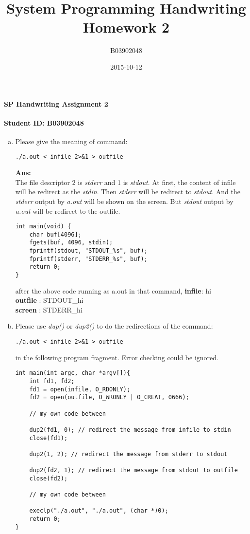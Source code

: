 \documentclass{article}
\title{System Programming Handwriting Homework 2}
\date{2015-10-12}
\author{B03902048}
\begin{document}
\paragraph
{\huge SP Handwriting Assignment 2}

\paragraph
{\Large Student ID: B03902048}

\large
\begin{enumerate}[(a)]

\item
Please give the meaning of command:
\begin{lstlisting}
./a.out < infile 2>&1 > outfile
\end{lstlisting}
\textbf{Ans:}\\
The file descriptor 2 is \textit{stderr} and 1 is \textit{stdout}.
At first, the content of infile will be redirect as the \textit{stdin}. 
Then \textit{stderr} will be redirect to \textit{stdout}. 
And the \textit{stderr} output by \textit{a.out} will be shown on the screen.
But \textit{stdout} output by \textit{a.out} will be redirect to the outfile.

\begin{lstlisting}
int main(void) {
	char buf[4096];
	fgets(buf, 4096, stdin);
	fprintf(stdout, "STDOUT_%s", buf);
	fprintf(stderr, "STDERR_%s", buf);
	return 0;
}
\end{lstlisting}

after the above code running as a.out in that command,
\newline
\textbf{infile}: hi\\
\textbf{outfile} : STDOUT\_hi \\
\textbf{screen} : STDERR\_hi


\item
Please use \textit{dup()} or \textit{dup2()} to do the redirections of the command:
\begin{lstlisting}
./a.out < infile 2>&1 > outfile
\end{lstlisting}
in the following program fragment. Error checking could be ignored.

\begin{lstlisting}
int main(int argc, char *argv[]){
	int fd1, fd2;
	fd1 = open(infile, O_RDONLY);
	fd2 = open(outfile, O_WRONLY | O_CREAT, 0666);
	
	// my own code between

	dup2(fd1, 0); // redirect the message from infile to stdin
	close(fd1);

	dup2(1, 2); // redirect the message from stderr to stdout

	dup2(fd2, 1); // redirect the message from stdout to outfile
	close(fd2);	
	
	// my own code between
	
	execlp("./a.out", "./a.out", (char *)0);
	return 0;
}
\end{lstlisting}

\end{enumerate}
\end{document}
